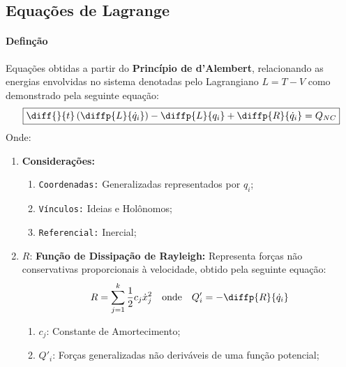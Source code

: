 \documentclass{article}
\begin{document}
        \subsection{Equações de Lagrange}
            \paragraph{Definção}Equações obtidas a partir do \textbf{Princípio de d'Alembert}, relacionando as energias envolvidas no sistema denotadas pelo Lagrangiano $L = T - V$ como demonstrado pela seguinte equação:
                \begin{equation}
                    \boxed{
                        \diff{}{t} \left(\diffp{L}{{\dot{q}_{i}}}\right) - 
                        \diffp{L}{{q_{i}}} + 
                        \diffp{R}{{\dot{q}_{i}}} = 
                        Q_{NC}
                    }
                \end{equation}
            Onde:
                \begin{enumerate}[rightmargin = \leftmargin, noitemsep]
                    \item \textbf{Considerações:}
                        \begin{enumerate}[noitemsep]
                            \item \texttt{Coordenadas:} Generalizadas representados por $q_{i}$;
                            \item \texttt{Vínculos:} Ideias e Holônomos;
                            \item \texttt{Referencial:} Inercial;
                        \end{enumerate}

                    \item $R$: \textbf{Função de Dissipação de Rayleigh:} Representa forças não conservativas proporcionais à velocidade, obtido pela seguinte equação:
                        \begin{equation}
                            R = \sum_{j=1}^{k} \frac{1}{2} c_{j} \dot{x}_{j}^{2}
                            \quad\text{onde}\quad
                            Q'_{i} = -\diffp{R}{{\dot{q}_{i}}}
                        \end{equation}
                        \begin{enumerate}[rightmargin = \leftmargin, noitemsep]
                            \item $c_{j}$: Constante de Amortecimento;
                            \item $Q'_{i}$: Forças generalizadas não deriváveis de uma função potencial;
                        \end{enumerate}
                \end{enumerate}
\end{document}
